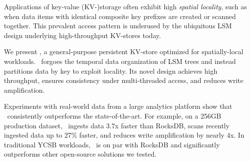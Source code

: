 Applications of key-value (KV-)storage often exhibit high \emph{spatial locality}, such as  
when data items with identical composite key prefixes are created or scanned together.  
This prevalent access pattern is underused by the ubiquitous LSM  design underlying 
high-throughput KV-stores today.

We present \sys, a general-purpose persistent KV-store optimized for spatially-local %
workloads. 
\sys\ forgoes the temporal data organization of LSM trees and instead partitions data by key to exploit locality. 
Its novel design achieves high throughput, 
ensures consistency under multi-threaded access,   
and reduces write amplification. 

Experiments with real-world data from a large analytics platform show that \sys\  
consistently outperforms the state-of-the-art. For example, on a 256GB production dataset, 
\sys\ ingests data 3.7x faster than RocksDB,  scans recently ingested data up to 27\% faster, 
and reduces write amplification by nearly 4x. 
In traditional YCSB workloads, %
\sys\ is on par with RocksDB and significantly outperforms other open-source solutions we tested.
